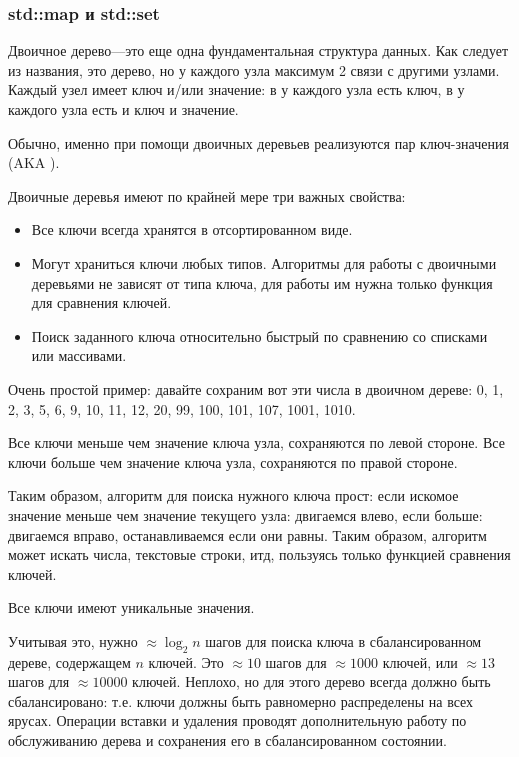 \subsubsection{std::map и std::set}

Двоичное дерево---это еще одна фундаментальная структура данных.
Как следует из названия, это дерево, но у каждого узла максимум 2 связи с другими узлами.
Каждый узел имеет ключ и/или значение:
в  у каждого узла есть ключ,
в  у каждого узла есть и ключ и значение.

Обычно, именно при помощи двоичных деревьев реализуются  пар ключ-значения 
(\ac{AKA} ).

Двоичные деревья имеют по крайней мере три важных свойства:

\begin{itemize}
\item Все ключи всегда хранятся в отсортированном виде.
\item Могут храниться ключи любых типов.
Алгоритмы для работы с двоичными деревьями не зависят от типа ключа,
для работы им нужна только функция для сравнения ключей.
\item Поиск заданного ключа относительно быстрый по сравнению со списками или массивами.
\end{itemize}

Очень простой пример: давайте сохраним вот эти числа в двоичном дереве:
0, 1, 2, 3, 5, 6, 9, 10, 11, 12, 20, 99, 100, 101, 107, 1001, 1010.



Все ключи меньше чем значение ключа узла, сохраняются по левой стороне.
Все ключи больше чем значение ключа узла, сохраняются по правой стороне.

Таким образом, алгоритм для поиска нужного ключа прост: если искомое значение меньше чем значение текущего узла:
двигаемся влево, если больше: двигаемся вправо, останавливаемся если они равны.
Таким образом, алгоритм может искать числа, текстовые строки, итд, 
пользуясь только функцией сравнения ключей.

Все ключи имеют уникальные значения.

Учитывая это, нужно $\approx \log_{2} n$ шагов для поиска ключа 
в сбалансированном дереве, содержащем $n$ ключей.
Это $\approx 10$ шагов для $\approx 1000$ ключей, или $\approx 13$ 
шагов для $\approx 10000$ ключей.
Неплохо, но для этого дерево всегда должно быть сбалансировано: т.е. ключи должны быть равномерно распределены
на всех ярусах.
Операции вставки и удаления проводят дополнительную работу по обслуживанию дерева и сохранения его в сбалансированном
состоянии.

